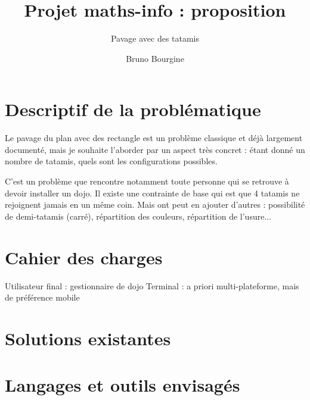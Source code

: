 \documentclass{scrartcl}
\begin{document}
    \title{Projet maths-info : proposition}
    \subtitle{Pavage avec des tatamis}
    \author{Bruno Bourgine\\}
    \maketitle

    \section{Descriptif de la problématique}

    Le pavage du plan avec des rectangle est un problème classique et déjà largement documenté,
    mais je souhaite l'aborder par un aspect très concret : étant donné un nombre de tatamis, quels sont les 
    configurations possibles.
    
    C'est un problème que rencontre notamment toute personne qui se retrouve à devoir installer un dojo.
    Il existe une contrainte de base qui est que 4 tatamis ne rejoignent jamais en un même coin. Mais ont peut
    en ajouter d'autres : possibilité de demi-tatamis (carré), répartition des couleurs, répartition de l'usure...

    \section{Cahier des charges}

    Utilisateur final : gestionnaire de dojo
    Terminal : a priori multi-plateforme, mais de préférence mobile

    \section{Solutions existantes}

    \section{Langages et outils envisagés}
\end{document}
